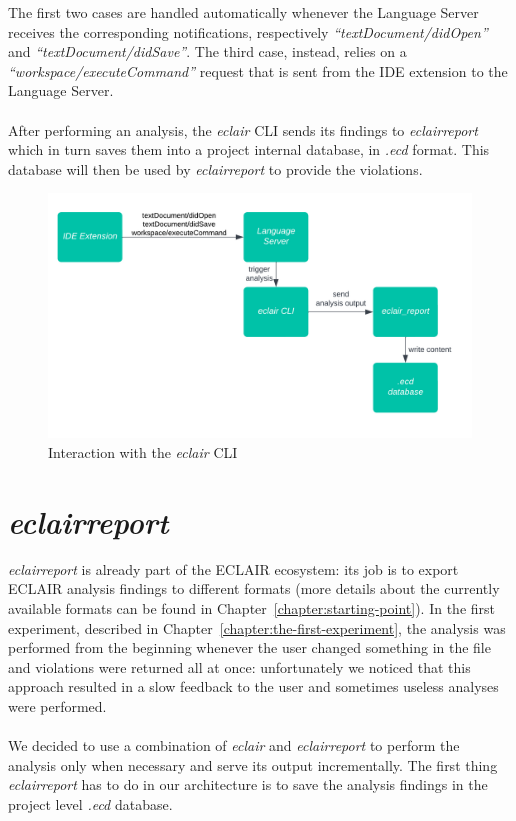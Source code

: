 The first two cases are handled automatically whenever the Language Server receives the corresponding notifications, respectively \emph{``textDocument/didOpen''} and \emph{``textDocument/didSave''}. The third case, instead, relies on a \emph{``workspace/executeCommand''} request that is sent from the IDE extension to the Language Server.
\\\\
After performing an analysis, the \emph{eclair} CLI sends its findings to \emph{eclair\textunderscore	report} which in turn saves them into a project internal database, in \emph{.ecd} format. This database will then be used by \emph{eclair\textunderscore	report} to provide the violations.

\begin{figure}[ht]
	\centering
	\includegraphics[width=1\textwidth]{Immagini/eclair_analyzer_flow.jpg}
	\caption{Interaction with the \emph{eclair} CLI}
	\label{fig:one}
\end{figure}

\section{\emph{eclair\textunderscore	report}}\label{sec:cap_sec_subsec}
\emph{eclair\textunderscore	report} is already part of the ECLAIR ecosystem: its job is to export ECLAIR analysis findings to different formats (more details about the currently available formats can be found in Chapter~\ref{chapter:starting-point}). 
In the first experiment, described in Chapter~\ref{chapter:the-first-experiment}, the analysis was performed from the beginning whenever the user changed something in the file and violations were returned all at once: unfortunately we noticed that this approach resulted in a slow feedback to the user and sometimes useless analyses were performed. 
\\\\
We decided to use a combination of \emph{eclair} and \emph{eclair\textunderscore	report} to perform the analysis only when necessary and serve its output incrementally. 
The first thing \emph{eclair\textunderscore	report} has to do in our architecture is to save the analysis findings in the project level \emph{.ecd} database. 

